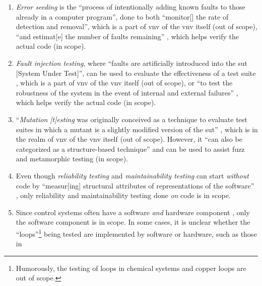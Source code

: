 \begin{enumerate}
      \item \emph{Error seeding} is the ``process of intentionally adding
            known faults to those already in a computer program'',
            done to both ``monitor[] the rate of detection and removal'',
            which is a part of \acs{vnv} of the \acs{vnv} itself (out of scope),
            ``and estimat[e] the number of faults remaining''
            \citep[p.~165]{IEEE2017}, which helps verify the actual code (in scope).
      \item \emph{Fault injection testing}, where ``faults are artificially
            introduced into the \acs{sut} [System Under Test]'', can be used to
            evaluate the effectiveness of a test suite \citep[p.~5-18]{SWEBOK2024},
            which is a part of \acs{vnv} of the \acs{vnv} itself (out of scope),
            or ``to test
            the robustness of the system in the event of internal and
            external failures'' \citep[p.~42]{IEEE2022}, which helps verify
            the actual code (in scope).
      \item ``\emph{Mutation [t]esting} was originally conceived as a
            technique to evaluate test suites in which a mutant is a slightly
            modified version of the \acs{sut}'' \citep[p.~5-15]{SWEBOK2024},
            which is in the realm of \acs{vnv} of the \acs{vnv} itself (out of
            scope). However, it ``can also be categorized as a structure-based
            technique'' and can be used to assist fuzz and metamorphic testing
            \citep[p.~5-15]{SWEBOK2024} (in scope).
            \ifnotpaper
      \item Even though \emph{reliability testing} and \emph{maintainability
                  testing} can start \emph{without} code by ``measur[ing]
            structural attributes of representations of the software''
            \citep[p.~18]{FentonAndPfleeger1997}, only reliability and
            maintainability testing done \emph{on} code is in scope.
      \item Since control systems often have a software \emph{and} hardware
            component \citep{ISO2015, PreußeEtAl2012,ForsythEtAl2004},
            only the software component is in scope. In some cases, it is
            unclear whether the ``loops''\footnote{Humorously, the testing of
                  loops in chemical systems \citep{Dominguez-PumarEtAl2020} and
                  copper loops \citep{Goralski1999} are out of scope.} being
            tested are implemented by software or hardware, such as those in

\end{enumerate}
